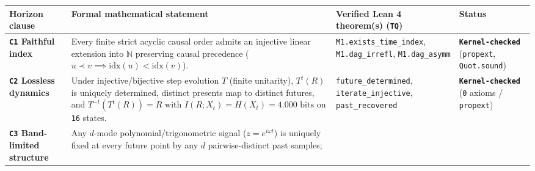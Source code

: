 \documentclass[10pt,letterpaper]{article}
\newcounter{none}
\begin{document}
{\def\LTcaptype{none} %
{\footnotesize\setlength{\tabcolsep}{3.8pt}\renewcommand{\arraystretch}{1.15}
\begin{longtable}[]{@{}
  >{\raggedright\arraybackslash}p{}
  >{\raggedright\arraybackslash}p{}
  >{\raggedright\arraybackslash}p{}
  >{\raggedright\arraybackslash}p{}@{}}
\toprule\noalign{}
\begin{minipage}[b]{\linewidth}\raggedright
\textbf{Horizon clause}
\end{minipage} & \begin{minipage}[b]{\linewidth}\raggedright
\textbf{Formal mathematical statement}
\end{minipage} & \begin{minipage}[b]{\linewidth}\raggedright
\textbf{Verified Lean 4 theorem(s) (\texttt{TQ})}
\end{minipage} & \begin{minipage}[b]{\linewidth}\raggedright
\textbf{Status}
\end{minipage} \\
\midrule\noalign{}
\endhead
\bottomrule\noalign{}
\endlastfoot
\textbf{\texttt{C1} Faithful index} & Every finite strict acyclic causal
order admits an injective linear extension into \(\mathbb{N}\)
preserving causal precedence
(\(u \prec v \implies \mathrm{idx}(u) < \mathrm{idx}(v)\)). &
\texttt{M1.\allowbreak{}exists\_\allowbreak{}time\_\allowbreak{}index}, \texttt{M1.\allowbreak{}dag\_\allowbreak{}irrefl},
\texttt{M1.\allowbreak{}dag\_\allowbreak{}asymm} & \textbf{\texttt{Kernel-\allowbreak{}checked}}
(\texttt{propext}, \texttt{Quot.\allowbreak{}sound}) \\
\textbf{\texttt{C2} Lossless dynamics} & Under injective/bijective step
evolution \(T\) (finite unitarity), \(T^t(R)\) is uniquely determined,
distinct presents map to distinct futures, and \(T^{-t}(T^t(R)) = R\)
with \(I(R; X_t) = H(X_t) = 4.000\text{ bits}\) on \texttt{16} states. &
\texttt{future\_\allowbreak{}determined}, \texttt{iterate\_\allowbreak{}injective},
\texttt{past\_\allowbreak{}recovered} & \textbf{\texttt{Kernel-\allowbreak{}checked}} (\texttt{0}
axioms / \texttt{propext}) \\
\textbf{\texttt{C3} Band-limited structure} & Any \(d\)-mode
polynomial/trigonometric signal (\(z = e^{i\omega t}\)) is uniquely
fixed at every future point by any \(d\) pairwise-distinct past samples;

\end{longtable}}}
\end{document}
